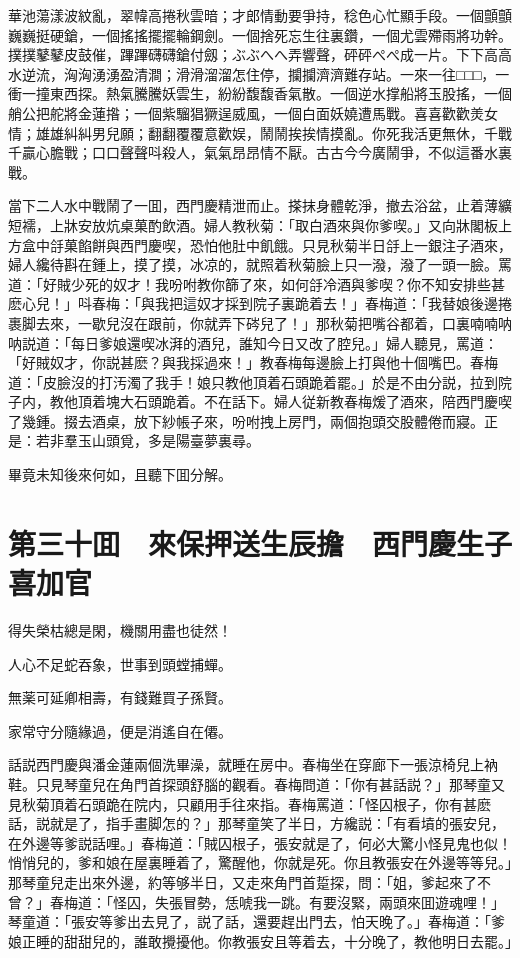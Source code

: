 華池蕩漾波紋亂，翠幃高捲秋雲暗；才郎情動要爭持，稔色心忙顯手段。一個顫顫巍巍挺硬鎗，一個搖搖擺擺輪鋼劍。一個捨死忘生往裏鑽，一個尤雲殢雨將功幹。撲撲鼕鼕皮鼓催，蹕蹕礴礴鎗付劔；ぶぶへへ弄響聲，砰砰ぺぺ成一片。下下高高水逆流，洶洶湧湧盈清澗；滑滑溜溜怎住停，攔攔濟濟難存站。一來一往□□□，一衝一撞東西探。熱氣騰騰妖雲生，紛紛馥馥香氣散。一個逆水撑船將玉股搖，一個艄公把舵將金蓮揝；一個紫騮猖獗逞威風，一個白面妖嬈遭馬戰。喜喜歡歡羙女情；雄雄糾糾男兒願；翻翻覆覆意歡娱，鬧鬧挨挨情摸亂。你死我活更無休，千戰千贏心膽戰；口口聲聲呌殺人，氣氣昂昂情不厭。古古今今廣鬧爭，不似這番水裏戰。

當下二人水中戰鬧了一囬，西門慶精泄而止。搽抹身體乾淨，撤去浴盆，止着薄纊短襦，上牀安放炕桌菓酌飲酒。婦人教秋菊：「取白酒來與你爹喫。」又向牀閣板上方盒中㧱菓餡餅與西門慶喫，恐怕他肚中飢餓。只見秋菊半日㧱上一銀注子酒來，婦人纔待斟在鍾上，摸了摸，冰凉的，就照着秋菊臉上只一潑，潑了一頭一臉。罵道：「好賊少死的奴才！我吩咐教你篩了來，如何㧱冷酒與爹喫？你不知安排些甚麽心兒！」呌春梅：「與我把這奴才採到院子裏跪着去！」春梅道：「我替娘後邊捲裹脚去來，一歇兒沒在跟前，你就弄下硶兒了！」那秋菊把嘴谷都着，口裏喃喃呐呐説道：「每日爹娘還喫冰湃的酒兒，誰知今日又改了腔兒。」婦人聽見，罵道：「好賊奴才，你説甚麽？與我採過來！」教春梅每邊臉上打與他十個嘴巴。春梅道：「皮臉沒的打汚濁了我手！娘只教他頂着石頭跪着罷。」於是不由分説，拉到院子内，教他頂着塊大石頭跪着。不在話下。婦人従新教春梅煖了酒來，陪西門慶喫了幾鍾。掇去酒桌，放下紗帳子來，吩咐拽上房門，兩個抱頭交股體倦而寢。正是：若非羣玉山頭覓，多是陽臺夢裏尋。

畢竟未知後來何如，且聽下囬分解。

\chapter*{第三十囬　來保押送生辰擔　西門慶生子喜加官}

得失榮枯總是閑，機關用盡也徒然！

人心不足蛇吞象，世事到頭螳捕蟬。

無薬可延卿相壽，有錢難買子孫賢。

家常守分隨緣過，便是消遙自在僊。

話説西門慶與潘金蓮兩個洗畢澡，就睡在房中。春梅坐在穿廊下一張涼椅兒上衲鞋。只見琴童兒在角門首探頭舒腦的觀看。春梅問道：「你有甚話説？」那琴童又見秋菊頂着石頭跪在院内，只顧用手往來指。春梅罵道：「怪囚根子，你有甚麽話，説就是了，指手畫脚怎的？」那琴童笑了半日，方纔説：「有看墳的張安兒，在外邊等爹説話哩。」春梅道：「賊囚根子，張安就是了，何必大驚小怪見鬼也似！悄悄兒的，爹和娘在屋裏睡着了，驚醒他，你就是死。你且教張安在外邊等等兒。」那琴童兒走出來外邊，約等够半日，又走來角門首踅探，問：「姐，爹起來了不曾？」春梅道：「怪囚，失張冒勢，恁唬我一跳。有要沒緊，兩頭來囬遊魂哩！」琴童道：「張安等爹出去見了，説了話，還要趕出門去，怕天晚了。」春梅道：「爹娘正睡的甜甜兒的，誰敢攪擾他。你教張安且等着去，十分晚了，教他明日去罷。」

